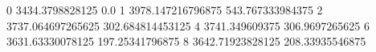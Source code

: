0 3434.3798828125 0.0
1 3978.147216796875 543.767333984375
2 3737.064697265625 302.684814453125
4 3741.349609375 306.9697265625
6 3631.63330078125 197.25341796875
8 3642.71923828125 208.33935546875
